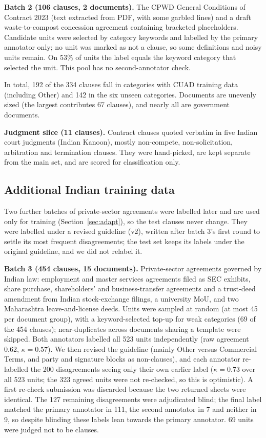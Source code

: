 \documentclass[conference]{IEEEtran}
\begin{document}
\textbf{Batch 2 (106 clauses, 2 documents).} The CPWD General Conditions of Contract 2023 (text extracted from PDF, with some garbled lines) and a draft waste-to-compost concession agreement containing bracketed placeholders. Candidate units were selected by category keywords and labelled by the primary annotator only; no unit was marked as not a clause, so some definitions and noisy units remain. On 53\% of units the label equals the keyword category that selected the unit. This pool has no second-annotator check.

In total, 192 of the 334 clauses fall in categories with CUAD training data (including Other) and 142 in the six unseen categories. Documents are unevenly sized (the largest contributes 67 clauses), and nearly all are government documents.

\textbf{Judgment slice (11 clauses).} Contract clauses quoted verbatim in five Indian court judgments (Indian Kanoon), mostly non-compete, non-solicitation, arbitration and termination clauses. They were hand-picked, are kept separate from the main set, and are scored for classification only.

\subsection{Additional Indian training data}
Two further batches of private-sector agreements were labelled later and are used only for training (Section~\ref{sec:adapt}), so the test clauses never change. They were labelled under a revised guideline (v2), written after batch 3's first round to settle its most frequent disagreements; the test set keeps its labels under the original guideline, and we did not relabel it.

\textbf{Batch 3 (454 clauses, 15 documents).} Private-sector agreements governed by Indian law: employment and master services agreements filed as SEC exhibits, share purchase, shareholders' and business-transfer agreements and a trust-deed amendment from Indian stock-exchange filings, a university MoU, and two Maharashtra leave-and-license deeds. Units were sampled at random (at most 45 per document group), with a keyword-selected top-up for weak categories (69 of the 454 clauses); near-duplicates across documents sharing a template were skipped. Both annotators labelled all 523 units independently (raw agreement 0.62, $\kappa=0.57$). We then revised the guideline (mainly Other versus Commercial Terms, and party and signature blocks as non-clauses), and each annotator re-labelled the 200 disagreements seeing only their own earlier label ($\kappa=0.73$ over all 523 units; the 323 agreed units were not re-checked, so this is optimistic). A first re-check submission was discarded because the two returned sheets were identical. The 127 remaining disagreements were adjudicated blind; the final label matched the primary annotator in 111, the second annotator in 7 and neither in 9, so despite blinding these labels lean towards the primary annotator. 69 units were judged not to be clauses.
\end{document}
